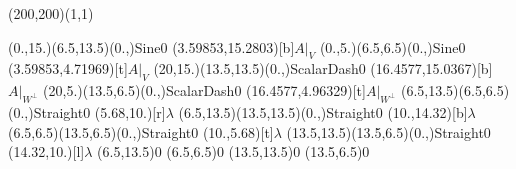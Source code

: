 \unitlength=1bp%

\begin{feynartspicture}(200,200)(1,1)

\FADiagram{}
\FAProp(0.,15.)(6.5,13.5)(0.,){Sine}{0}
\FALabel(3.59853,15.2803)[b]{$A|_V$}
\FAProp(0.,5.)(6.5,6.5)(0.,){Sine}{0}
\FALabel(3.59853,4.71969)[t]{$A|_V$}
\FAProp(20,15.)(13.5,13.5)(0.,){ScalarDash}{0}
\FALabel(16.4577,15.0367)[b]{$A|_{W^\perp}$}
\FAProp(20,5.)(13.5,6.5)(0.,){ScalarDash}{0}
\FALabel(16.4577,4.96329)[t]{$A|_{W^\perp}$}
\FAProp(6.5,13.5)(6.5,6.5)(0.,){Straight}{0}
\FALabel(5.68,10.)[r]{$\lambda$}
\FAProp(6.5,13.5)(13.5,13.5)(0.,){Straight}{0}
\FALabel(10.,14.32)[b]{$\lambda$}
\FAProp(6.5,6.5)(13.5,6.5)(0.,){Straight}{0}
\FALabel(10.,5.68)[t]{$\lambda$}
\FAProp(13.5,13.5)(13.5,6.5)(0.,){Straight}{0}
\FALabel(14.32,10.)[l]{$\lambda$}
\FAVert(6.5,13.5){0}
\FAVert(6.5,6.5){0}
\FAVert(13.5,13.5){0}
\FAVert(13.5,6.5){0}
\end{feynartspicture}

